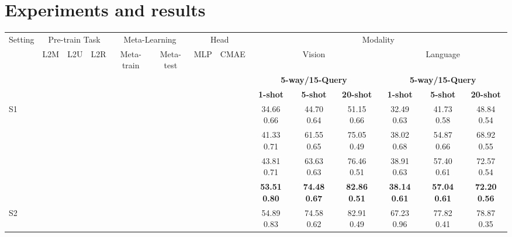 \documentclass[preprint,review,12pt]{elsarticle}
\newcommand{\cmark}{\ding{51}}\newcommand{\xmark}{\ding{55}}\usepackage{setspace} \doublespacing
\begin{document}
\section{Experiments and results}
\label{sec:results}
\begin{table*}[t]
\centering
\begin{center}
    \resizebox{\linewidth}{!} {\begin{tabular}{l|ccc|cc|cc|ccc|ccc}
    \hline
    Setting & \multicolumn{3}{c}{Pre-train Task} & \multicolumn{2}{c}{Meta-Learning} & \multicolumn{2}{c}{Head} & \multicolumn{6}{c}{Modality} \\
    & L2M & L2U & L2R & Meta-train & Meta-test & MLP & CMAE & \multicolumn{3}{c}{Vision} & \multicolumn{3}{c}{Language}\\
    
    \hline
    
    & & & & & & & & \multicolumn{3}{c}{\textbf{5-way/15-Query}} & \multicolumn{3}{c}{\textbf{5-way/15-Query}} \\
    & & & & & & & & \textbf{1-shot} & \textbf{5-shot} & \textbf{20-shot} & \textbf{1-shot} & \textbf{5-shot} & \textbf{20-shot} \\
    \cline{9-14}
    
    \multirow{4}{*}{S1} 
    & \cmark & \xmark & \xmark
    & \xmark & \cmark
    & \xmark & \xmark 
    & 34.66  0.66 & 44.70  0.64 & 51.15  0.66  
    & 32.49  0.63 & 41.73  0.58 & 48.84  0.54 \\

    & \cmark & \xmark & \xmark
    & \xmark & \cmark
    & \cmark & \xmark 
    & 41.33  0.71 & 61.55  0.65 & 75.05  0.49
    & 38.02  0.68 & 54.87  0.66 & 68.92  0.55 \\
    
    & \cmark & \xmark & \xmark
    & \cmark &\cmark
    & \xmark &\xmark 
    & 43.81  0.71 & 63.63  0.63 & 76.46  0.51 
    & 38.91  0.63 & 57.40  0.61 & 72.57  0.54 \\

    & \cmark & \xmark & \xmark
    & \cmark &\cmark
    & \cmark &\xmark & 
    \textbf{53.51}  \textbf{0.80} & \textbf{74.48}  \textbf{0.67} & \textbf{82.86}  \textbf{0.51}  
    & \textbf{38.14}  \textbf{0.61} & \textbf{57.04}  \textbf{0.61} & \textbf{72.20}  \textbf{0.56} \\
    
    \hline
    
    \multirow{2}{*}{S2} 
    & \cmark & \cmark & \xmark
    & \xmark & \cmark
    & \xmark & \cmark & 54.89  0.83 & 74.58  0.62 & 82.91  0.49
    & 67.23  0.96 & 77.82  0.41 & 78.87  0.35 \\


\end{tabular}}
\end{center}
\end{table*}
\end{document}
